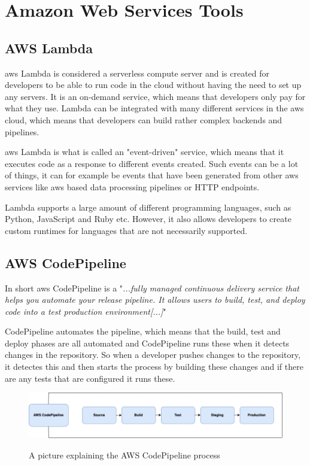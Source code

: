 \section{Amazon Web Services Tools}
\subsection{AWS Lambda}
\acrshort{aws} Lambda is considered a serverless compute server and is created for developers to be able to run code in the cloud without having the need to set up any servers. It is an on-demand service, which means that developers only pay for what they use. Lambda can be integrated with many different services in the \acrshort{aws} cloud, which means that developers can build rather complex backends and pipelines. 

\acrshort{aws} Lambda is what is called an "event-driven" service, which means that it executes code as a response to different events created. Such events can be a lot of things, it can for example be events that have been generated from other \acrshort{aws} services like \acrshort{aws} based data processing pipelines or HTTP endpoints. 

Lambda supports a large amount of different programming languages, such as Python, JavaScript and Ruby etc. However, it also allows developers to create custom runtimes for languages that are not necessarily supported. \cite{AWSLamda}



\subsection{AWS CodePipeline}
In short \acrshort{aws} CodePipeline is a "\textit{...fully managed continuous delivery service that helps you automate your release pipeline. It allows users to build, test, and deploy code into a test production environment[...]}"
\cite{AWSCodePipeline}

CodePipeline automates the pipeline, which means that the build, test and deploy phases are all automated and CodePipeline runs these when it detects changes in the repository. So when a developer pushes changes to the repository, it detectes this and then starts the process by building these changes and if there are any tests that are configured it runs these. \cite{AWSCodePipeline1}
\begin{figure}[htp]
    \centering
    \includegraphics[width=1\columnwidth]{Images/CodePipeline.png}
    \caption{A picture explaining the AWS CodePipeline process}\cite{AWSCodePipeline2}
    \label{fig:my_label}
\end{figure}


